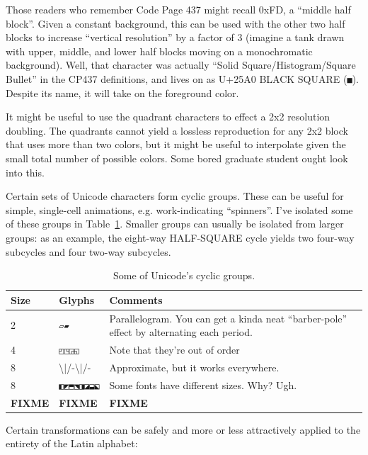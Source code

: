 \documentclass[letterpaper,10pt]{article}
\begin{document}
Those readers who remember Code Page 437 might recall 0xFD, a ``middle half
block''. Given a constant background, this can be used with the other two
half blocks to increase ``vertical resolution'' by a factor of 3 (imagine a
tank drawn with upper, middle, and lower half blocks moving on a monochromatic
background). Well, that character was actually ``Solid Square/Histogram/Square Bullet''
in the CP437 definitions\cite{cp437}, and lives on as U+25A0 BLACK SQUARE (\texttt{■}).
Despite its name, it will take on the foreground color.

It might be useful to use the quadrant characters to effect a 2x2 resolution
doubling. The quadrants cannot yield a lossless reproduction for any 2x2 block
that uses more than two colors, but it might be useful to interpolate given the
small total number of possible colors. Some bored graduate student ought look
into this.

Certain sets of Unicode characters form cyclic groups. These can be useful for
simple, single-cell animations, e.g. work-indicating ``spinners''. I've isolated
some of these groups in Table~\ref{table:cyclics}. Smaller groups can usually
be isolated from larger groups: as an example, the eight-way HALF-SQUARE cycle
yields two four-way subcycles and four two-way subcycles.

\begin{table}[!htb]
  \centering
  \begin{tabular}{|l|l|p{.6\linewidth}|}
    \hline
    Size & Glyphs & Comments \\
    \hline
    \hline
    2 & \texttt{▱▰} & Parallelogram. You can get a kinda neat ``barber-pole'' effect by alternating each period. \\
    \hline
    4 & \texttt{◰◳◲◱} & Note that they're out of order \\
    \hline
    8 & \textbackslash{}|/-\textbackslash{}|/- & Approximate, but it works everywhere. \\
    \hline
    8 & \texttt{◧◩⬒⬔◨◪⬓⬕} & Some fonts have different sizes. Why? Ugh. \\
    \hline
    \textbf{FIXME} & \textbf{FIXME} & \textbf{FIXME} \\ 
    \hline
  \end{tabular}
  \caption{Some of Unicode's cyclic groups.}
  \label{table:cyclics}
\end{table}

Certain transformations can be safely and more or less attractively applied
to the entirety of the Latin alphabet:
\end{document}
